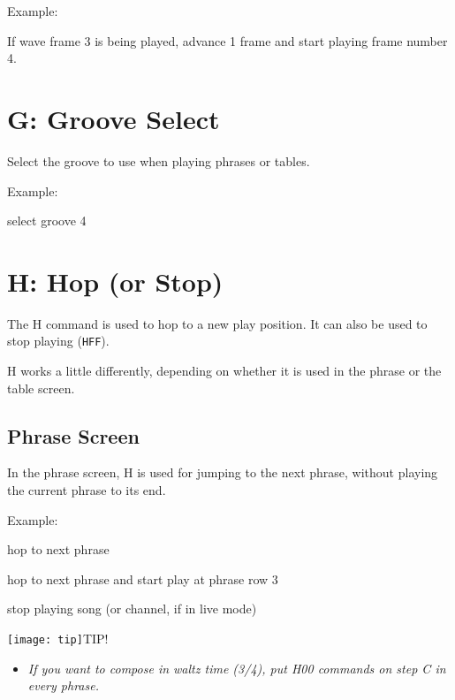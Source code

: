 \begin{description}
\item Example:
\item[F01] If wave frame 3 is being played, advance 1 frame and start playing frame number 4.
\end{description}

\section{G: Groove Select}

Select the groove to use when playing phrases or tables.

\begin{description}
\item Example:
\item[G04] select groove 4
\end{description}

\section{H: Hop (or Stop)}

The H command is used to hop to a new play position. It can also be used to stop playing (\texttt{HFF}).

H works a little differently, depending on whether it is used in the phrase or the table screen.

\subsection{Phrase Screen}

In the phrase screen, H is used for jumping to the next phrase, without playing the current phrase to its end.
\begin{description}
\item Example:
\item[H00] hop to next phrase
\item[H03] hop to next phrase and start play at phrase row 3
\item[HFF] stop playing song (or channel, if in live mode)
\end{description}
\texttt{[image: tip]}TIP!
\nolinebreak
\begin{itemize}
        \item \textit{If you want to compose in waltz time (3/4), put \textsc{H00} commands on step \textsc{C} in every phrase.}
\end{itemize}


